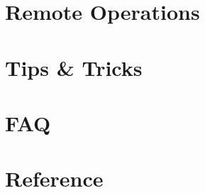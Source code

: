 ﻿\documentclass[xcolor=svgnames]{beamer}
\begin{document}
\part[Remote Operations]{Remote Operations}
\begin{frame}
\end{frame}


\part[Tips \& Tricks]{Tips \& Tricks}
\begin{frame}
\end{frame}


\part[FAQ]{FAQ}
\begin{frame}
\end{frame}


\part[Reference]{Reference}
\end{document}
